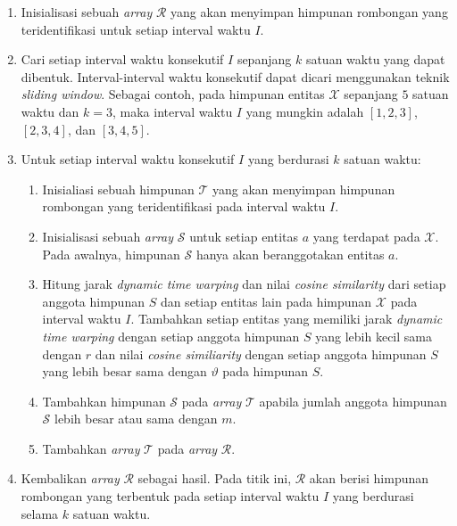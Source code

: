 \documentclass[a4paper,twoside]{article}
\begin{document}
\begin{enumerate}
		\begin{enumerate}
            \item Inisialisasi sebuah \textit{array} $\mathcal{R}$ yang akan menyimpan himpunan rombongan yang teridentifikasi untuk setiap interval waktu $I$.
            \item Cari setiap interval waktu konsekutif $I$ sepanjang $k$ satuan waktu yang dapat dibentuk. Interval-interval waktu konsekutif dapat dicari menggunakan teknik \textit{sliding window}. Sebagai contoh, pada himpunan entitas $\mathcal{X}$ sepanjang $5$ satuan waktu dan $k = 3$, maka interval waktu $I$ yang mungkin adalah $[1, 2, 3]$, $[2, 3, 4]$, dan $[3, 4, 5]$.
            \item Untuk setiap interval waktu konsekutif $I$ yang berdurasi $k$ satuan waktu:
    
            \begin{enumerate}
                \item Inisialiasi sebuah himpunan $\mathcal{T}$ yang akan menyimpan himpunan rombongan yang teridentifikasi pada interval waktu $I$.  
                \item Inisialisasi sebuah \textit{array} $\mathcal{S}$ untuk setiap entitas $a$ yang terdapat pada $\mathcal{X}$. Pada awalnya, himpunan $\mathcal{S}$ hanya akan beranggotakan entitas $a$.
                \item Hitung jarak \textit{dynamic time warping} dan nilai \textit{cosine similarity} dari setiap anggota himpunan $S$ dan setiap entitas lain pada himpunan $\mathcal{X}$ pada interval waktu $I$. Tambahkan setiap entitas yang memiliki jarak \textit{dynamic time warping} dengan setiap anggota himpunan $S$ yang lebih kecil sama dengan $r$ dan nilai \textit{cosine similiarity} dengan setiap anggota himpunan $S$ yang lebih besar sama dengan $\vartheta$ pada himpunan $S$.
                \item Tambahkan himpunan $\mathcal{S}$ pada \textit{array} $\mathcal{T}$ apabila jumlah anggota himpunan $\mathcal{S}$ lebih besar atau sama dengan $m$.
                \item Tambahkan \textit{array} $\mathcal{T}$ pada \textit{array} $\mathcal{R}$.
            \end{enumerate}
            \item Kembalikan \textit{array} $\mathcal{R}$ sebagai hasil. Pada titik ini, $\mathcal{R}$ akan berisi himpunan rombongan yang terbentuk pada setiap interval waktu $I$ yang berdurasi selama $k$ satuan waktu.
        \end{enumerate}


\end{enumerate}
\end{document}
